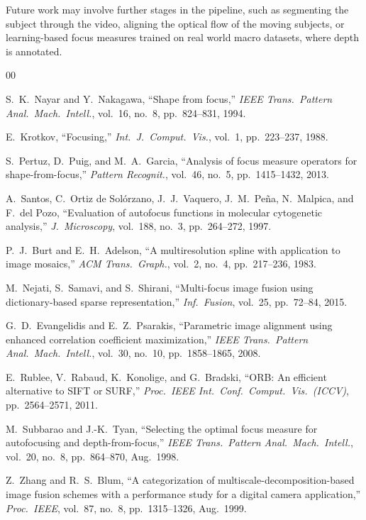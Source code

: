 \documentclass[conference]{IEEEtran}
\begin{document}
Future work may involve further stages in the pipeline, such as segmenting the subject through the video, aligning the optical flow of the moving subjects, or learning-based focus measures trained on real world macro datasets, where depth is annotated.
\begin{thebibliography}{00}

S.~K.~Nayar and Y.~Nakagawa, ``Shape from focus,''
\textit{IEEE Trans.\ Pattern Anal.\ Mach.\ Intell.}, vol.~16, no.~8, pp.~824--831, 1994.

E.~Krotkov, ``Focusing,''
\textit{Int.\ J.\ Comput.\ Vis.}, vol.~1, pp.~223--237, 1988.

S.~Pertuz, D.~Puig, and M.~A.~Garcia, ``Analysis of focus measure operators for shape-from-focus,''
\textit{Pattern Recognit.}, vol.~46, no.~5, pp.~1415--1432, 2013.

A.~Santos, C.~Ortiz de Sol\'orzano, J.~J.~Vaquero, J.~M.~Pe\~na, N.~Malpica, and F.~del Pozo, ``Evaluation of autofocus functions in molecular cytogenetic analysis,''
\textit{J.\ Microscopy}, vol.~188, no.~3, pp.~264--272, 1997.

P.~J.~Burt and E.~H.~Adelson, ``A multiresolution spline with application to image mosaics,''
\textit{ACM Trans.\ Graph.}, vol.~2, no.~4, pp.~217--236, 1983.

M.~Nejati, S.~Samavi, and S.~Shirani, ``Multi-focus image fusion using dictionary-based sparse representation,''
\textit{Inf.\ Fusion}, vol.~25, pp.~72--84, 2015.

G.~D.~Evangelidis and E.~Z.~Psarakis, ``Parametric image alignment using enhanced correlation coefficient maximization,''
\textit{IEEE Trans.\ Pattern Anal.\ Mach.\ Intell.}, vol.~30, no.~10, pp.~1858--1865, 2008.

E.~Rublee, V.~Rabaud, K.~Konolige, and G.~Bradski, ``ORB: An efficient alternative to SIFT or SURF,''
\textit{Proc.\ IEEE Int.\ Conf.\ Comput.\ Vis.\ (ICCV)}, pp.~2564--2571, 2011.

M.~Subbarao and J.-K.~Tyan, ``Selecting the optimal focus measure for autofocusing and depth-from-focus,''
\textit{IEEE Trans.\ Pattern Anal.\ Mach.\ Intell.}, vol.~20, no.~8, pp.~864--870, Aug.\ 1998.

Z.~Zhang and R.~S.~Blum, ``A categorization of multiscale-decomposition-based image fusion schemes with a performance study for a digital camera application,''
\textit{Proc.\ IEEE}, vol.~87, no.~8, pp.~1315--1326, Aug.\ 1999.


\end{thebibliography}
\end{document}
